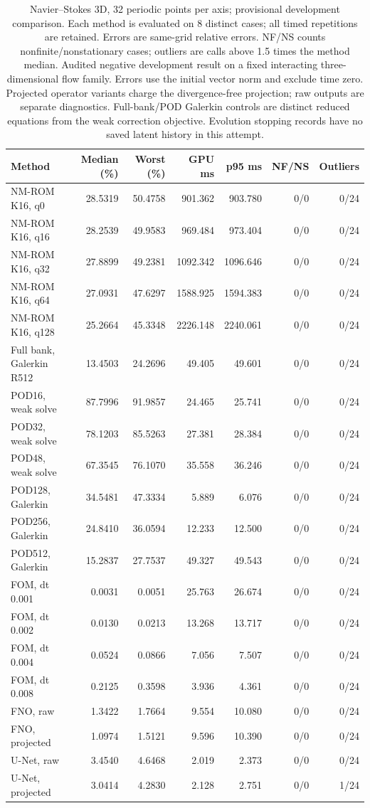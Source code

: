 \begin{table}[htbp]
\centering
\small
\setlength{\tabcolsep}{3pt}
\begin{tabular}{lrrrrrr}
\toprule
Method & Median (\%) & Worst (\%) & GPU ms & p95 ms & NF/NS & Outliers \\
\midrule
NM-ROM K16, q0 & 28.5319 & 50.4758 & 901.362 & 903.780 & 0/0 & 0/24 \\
NM-ROM K16, q16 & 28.2539 & 49.9583 & 969.484 & 973.404 & 0/0 & 0/24 \\
NM-ROM K16, q32 & 27.8899 & 49.2381 & 1092.342 & 1096.646 & 0/0 & 0/24 \\
NM-ROM K16, q64 & 27.0931 & 47.6297 & 1588.925 & 1594.383 & 0/0 & 0/24 \\
NM-ROM K16, q128 & 25.2664 & 45.3348 & 2226.148 & 2240.061 & 0/0 & 0/24 \\
Full bank, Galerkin R512 & 13.4503 & 24.2696 & 49.405 & 49.601 & 0/0 & 0/24 \\
POD16, weak solve & 87.7996 & 91.9857 & 24.465 & 25.741 & 0/0 & 0/24 \\
POD32, weak solve & 78.1203 & 85.5263 & 27.381 & 28.384 & 0/0 & 0/24 \\
POD48, weak solve & 67.3545 & 76.1070 & 35.558 & 36.246 & 0/0 & 0/24 \\
POD128, Galerkin & 34.5481 & 47.3334 & 5.889 & 6.076 & 0/0 & 0/24 \\
POD256, Galerkin & 24.8410 & 36.0594 & 12.233 & 12.500 & 0/0 & 0/24 \\
POD512, Galerkin & 15.2837 & 27.7537 & 49.327 & 49.543 & 0/0 & 0/24 \\
FOM, dt 0.001 & 0.0031 & 0.0051 & 25.763 & 26.674 & 0/0 & 0/24 \\
FOM, dt 0.002 & 0.0130 & 0.0213 & 13.268 & 13.717 & 0/0 & 0/24 \\
FOM, dt 0.004 & 0.0524 & 0.0866 & 7.056 & 7.507 & 0/0 & 0/24 \\
FOM, dt 0.008 & 0.2125 & 0.3598 & 3.936 & 4.361 & 0/0 & 0/24 \\
FNO, raw & 1.3422 & 1.7664 & 9.554 & 10.080 & 0/0 & 0/24 \\
FNO, projected & 1.0974 & 1.5121 & 9.596 & 10.390 & 0/0 & 0/24 \\
U-Net, raw & 3.4540 & 4.6468 & 2.019 & 2.373 & 0/0 & 0/24 \\
U-Net, projected & 3.0414 & 4.2830 & 2.128 & 2.751 & 0/0 & 1/24 \\
\bottomrule
\end{tabular}
\caption{Navier–Stokes 3D, 32 periodic points per axis; provisional development comparison. Each method is evaluated on 8 distinct cases; all timed repetitions are retained. Errors are same-grid relative errors. NF/NS counts nonfinite/nonstationary cases; outliers are calls above 1.5 times the method median. Audited negative development result on a fixed interacting three-dimensional flow family. Errors use the initial vector norm and exclude time zero. Projected operator variants charge the divergence-free projection; raw outputs are separate diagnostics. Full-bank/POD Galerkin controls are distinct reduced equations from the weak correction objective. Evolution stopping records have no saved latent history in this attempt.}
\label{tab:ns3d-comparison02-n32}
\end{table}
